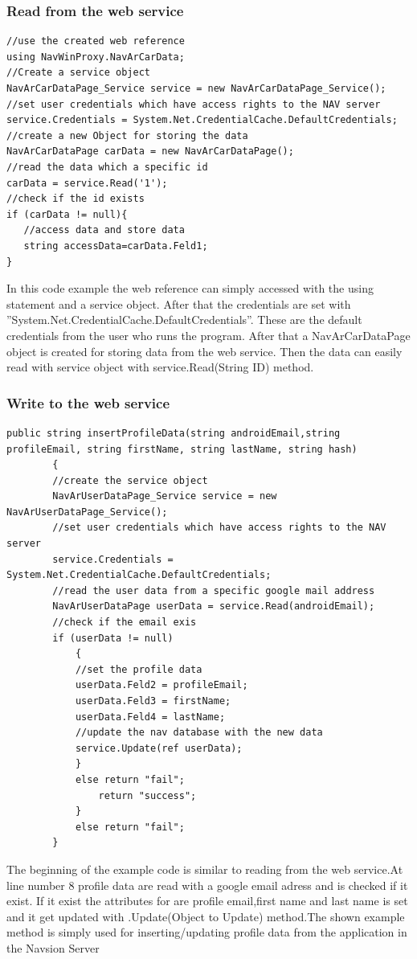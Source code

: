 \subsubsection{Read from the web service}
\begin{lstlisting}[caption=Example reading webservice,captionpos=b]
//use the created web reference
using NavWinProxy.NavArCarData;
//Create a service object
NavArCarDataPage_Service service = new NavArCarDataPage_Service();
//set user credentials which have access rights to the NAV server
service.Credentials = System.Net.CredentialCache.DefaultCredentials;
//create a new Object for storing the data
NavArCarDataPage carData = new NavArCarDataPage();                
//read the data which a specific id
carData = service.Read('1');
//check if the id exists
if (carData != null){
   //access data and store data
   string accessData=carData.Feld1;
}
\end{lstlisting}      

In this code example the web reference can simply accessed with the using statement and a service object. After that the credentials are set with ''System.Net.CredentialCache.DefaultCredentials''.
These are the default credentials from the user who runs the program. After that a  NavArCarDataPage object is created for storing data from the web service. Then the data can easily read with service object with service.Read(String ID)  method.
\newpage
\subsubsection{Write to the web service}
\begin{lstlisting}[caption=Example writing to web service,captionpos=b]
 public string insertProfileData(string androidEmail,string profileEmail, string firstName, string lastName, string hash)
        {
        //create the service object
        NavArUserDataPage_Service service = new NavArUserDataPage_Service();
        //set user credentials which have access rights to the NAV server
        service.Credentials = System.Net.CredentialCache.DefaultCredentials;
        //read the user data from a specific google mail address
        NavArUserDataPage userData = service.Read(androidEmail);
        //check if the email exis 
        if (userData != null)
            {
            //set the profile data
            userData.Feld2 = profileEmail;
            userData.Feld3 = firstName;
            userData.Feld4 = lastName;
            //update the nav database with the new data
            service.Update(ref userData);
            }
            else return "fail";
                return "success";
            }
            else return "fail";
        }
\end{lstlisting}
The beginning of the example code is similar to reading from the web service.At line number 8 profile data are read with a google email adress and is checked if it exist. If it exist the attributes for are profile email,first name and last name is set and it get updated with .Update(Object to Update) method.The shown example method is simply used for inserting/updating profile data from the application in the Navsion Server 
  
